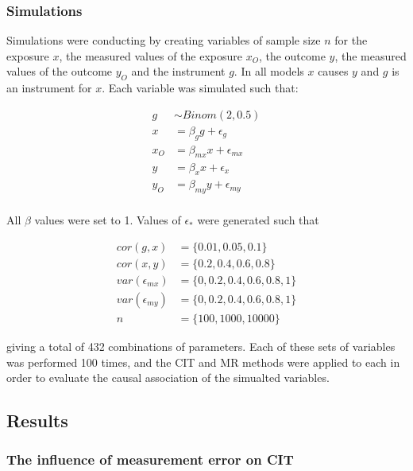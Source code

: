 \documentclass[]{article}
\begin{document}
\subsubsection{Simulations}\label{simulations}

Simulations were conducting by creating variables of sample size \(n\)
for the exposure \(x\), the measured values of the exposure \(x_O\), the
outcome \(y\), the measured values of the outcome \(y_O\) and the
instrument \(g\). In all models \(x\) causes \(y\) and \(g\) is an
instrument for \(x\). Each variable was simulated such that:

\[
\begin{aligned}
g & \sim Binom(2, 0.5) \\
x & = \beta_g g + \epsilon_g \\
x_O & = \beta_{mx} x + \epsilon_{mx} \\
y & = \beta_x x + \epsilon_x \\
y_O & = \beta_{my} y + \epsilon_{my} \\
\end{aligned}
\]

All \(\beta\) values were set to 1. Values of \(\epsilon_*\) were
generated such that

\[
\begin{aligned}
cor(g, x) & = \{0.01, 0.05, 0.1\} \\
cor(x, y) & = \{0.2, 0.4, 0.6, 0.8\} \\
var(\epsilon_{mx}) & = \{0, 0.2, 0.4, 0.6, 0.8, 1\} \\
var(\epsilon_{my}) & = \{0, 0.2, 0.4, 0.6, 0.8, 1\} \\
n & = \{100, 1000, 10000\}
\end{aligned}
\]

giving a total of 432 combinations of parameters. Each of these sets of
variables was performed 100 times, and the CIT and MR methods were
applied to each in order to evaluate the causal association of the
simualted variables.

\subsection{Results}\label{results}

\subsubsection{The influence of measurement error on
CIT}\label{the-influence-of-measurement-error-on-cit}
\end{document}
